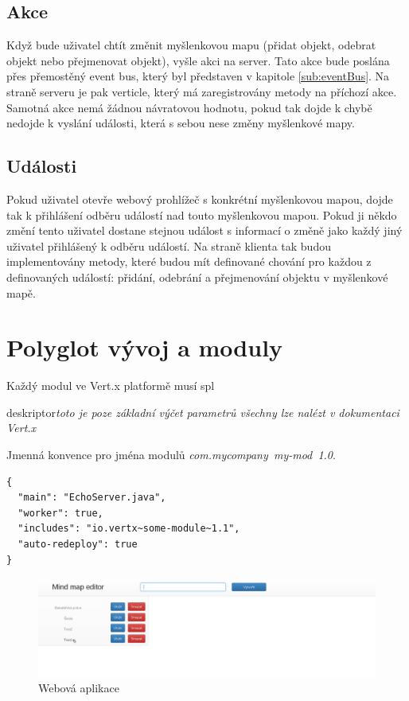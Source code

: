 \subsection{Akce}

Když bude uživatel chtít změnit myšlenkovou mapu (přidat objekt, odebrat objekt nebo přejmenovat objekt), vyšle akci na server. Tato akce bude poslána přes přemostěný event bus, který byl představen v kapitole \ref{sub:eventBus}. Na straně serveru je pak verticle, který má zaregistrovány metody na příchozí akce. Samotná akce nemá žádnou návratovou hodnotu, pokud tak dojde k chybě nedojde k vyslání události, která s sebou nese změny myšlenkové mapy.

\subsection{Události}

Pokud uživatel otevře webový prohlížeč s konkrétní myšlenkovou mapou, dojde tak k přihlášení odběru událostí nad touto myšlenkovou mapou. Pokud ji někdo změní tento uživatel dostane stejnou událost s informací o změně jako každý jiný uživatel přihlášený k odběru událostí.
Na straně klienta tak budou implementovány metody, které budou mít definované chování pro každou z definovaných událostí: přidání, odebrání a přejmenování objektu v myšlenkové mapě.

\section{Polyglot vývoj a moduly}\label{sec:praktickyModuly}

Každý modul ve Vert.x platformě musí spl

 deskriptor\emph{toto je poze základní výčet parametrů všechny lze nalézt v dokumentaci Vert.x}

Jmenná konvence pro jména modulů \emph{com.mycompany~my-mod~1.0}.

\begin{lstlisting}
{
  "main": "EchoServer.java",
  "worker": true,
  "includes": "io.vertx~some-module~1.1",
  "auto-redeploy": true
}
\end{lstlisting}

\begin{figure}
\begin{centering}
\includegraphics[width	=1\textwidth]{obrazky/mindmap1}
\par\end{centering}
\caption{Webová aplikace\label{fig:midnmap1}}
\end{figure}

